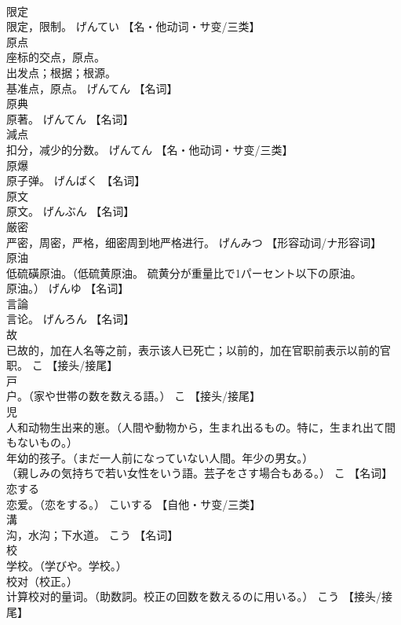 \documentclass[8pt]{extreport}
\begin{document}
\begin{CJK}{UTF8}{min}
\\	限定	
\\	限定，限制。	げんてい		【名・他动词・サ变/三类】
\\	原点	
\\	座标的交点，原点。 
\\	出发点；根据；根源。 
\\	基准点，原点。	げんてん		【名词】
\\	原典	
\\	原著。	げんてん		【名词】
\\	減点	
\\	扣分，减少的分数。	げんてん		【名・他动词・サ变/三类】
\\	原爆	
\\	原子弹。	げんばく		【名词】
\\	原文	
\\	原文。	げんぶん		【名词】
\\	厳密	
\\	严密，周密，严格，细密周到地严格进行。	げんみつ		【形容动词/ナ形容词】
\\	原油	
\\	低硫磺原油。（低硫黄原油。 硫黄分が重量比で1パーセント以下の原油。
\\	原油。）	げんゆ		【名词】
\\	言論	
\\	言论。	げんろん		【名词】
\\	故	
\\	已故的，加在人名等之前，表示该人已死亡；以前的，加在官职前表示以前的官职。	こ		【接头/接尾】
\\	戸	
\\	户。（家や世帯の数を数える語。）	こ		【接头/接尾】
\\	児	
\\	人和动物生出来的崽。（人間や動物から，生まれ出るもの。特に，生まれ出て間もないもの。） 
\\	年幼的孩子。（まだ一人前になっていない人間。年少の男女。） 
\\	（親しみの気持ちで若い女性をいう語。芸子をさす場合もある。）	こ		【名词】
\\	恋する	
\\	恋爱。（恋をする。）	こいする		【自他・サ变/三类】
\\	溝	
\\	沟，水沟；下水道。	こう		【名词】
\\	校	
\\	学校。（学びや。学校。） 
\\	校对（校正。） 
\\	计算校对的量词。（助数詞。校正の回数を数えるのに用いる。）	こう		【接头/接尾】

\end{CJK}
\end{document}
